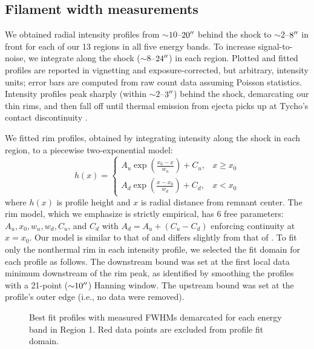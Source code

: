 \documentclass[iop, apj, numberedappendix, twocolappendix]{emulateapj}
\newcommand*{\abt}{\mathord{\sim}} %
\begin{document}
\subsection{Filament width measurements}
\label{sec:fwhms}

We obtained radial intensity profiles from $\abt 10$--$20\mbox{$^{\prime\prime}$}$ behind the
shock to $\abt 2$--$8\mbox{$^{\prime\prime}$}$ in front for each of our 13 regions in all five
energy bands.  To increase signal-to-noise, we integrate along the shock ($\abt
8$--$24\mbox{$^{\prime\prime}$}$) in each region.  Plotted and fitted profiles are reported in
vignetting and exposure-corrected, but arbitrary, intensity units; error bars
are computed from raw count data assuming Poisson statistics.  Intensity
profiles peak sharply (within $\abt 2$--$3\mbox{$^{\prime\prime}$}$) behind the shock,
demarcating our thin rims, and then fall off until thermal emission from ejecta
picks up at Tycho's contact discontinuity \citep{warren2005}.

We fitted rim profiles, obtained by integrating intensity along the shock in
each region, to a piecewise two-exponential model:
\begin{equation} \label{eq:prof}
    h(x) =
    \begin{cases}
        A_u \exp \left(\frac{x_0 - x}{w_u}\right) + C_u, &x \geq x_0 \\
        A_d \exp \left(\frac{x - x_0}{w_d}\right) + C_d, &x < x_0
    \end{cases}
\end{equation}
where $h(x)$ is profile height and $x$ is radial distance from remnant center.
The rim model, which we emphasize is strictly empirical, has 6 free parameters:
$A_u, x_0, w_u, w_d, C_u$, and $C_d$ with $A_d = A_u + (C_u - C_d)$ enforcing
continuity at $x=x_0$. Our model is similar to that of \citet{bamba2003,
bamba2005-hist} and differs slightly from that of .
To fit only the nonthermal rim in each intensity profile, we selected the fit
domain for each profile as follows.  The downstream bound was set at the first
local data minimum downstream of the rim peak, as identified by smoothing the
profiles with a 21-point ($\abt 10\arcsec$) Hanning window.  The upstream bound
was set at the profile's outer edge (i.e., no data were removed).

\begin{figure*}[ht]
    \caption{Best fit profiles with measured FWHMs demarcated for each energy
             band in Region 1.  Red data points are excluded from profile fit
             domain.}
    \label{fig:profiles}
\end{figure*}
\end{document}
